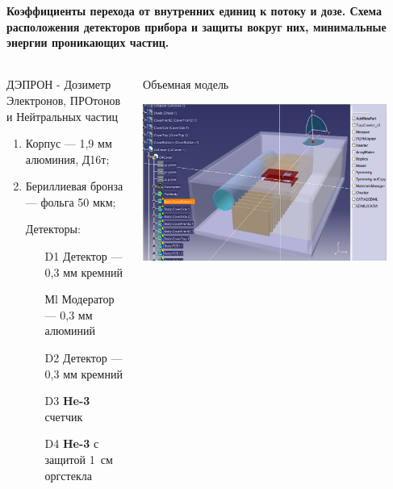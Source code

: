\documentclass[t, aspectratio=43]{beamer}
\begin{document}
\begin{frame}
\frametitle{\insertsection} 
\framesubtitle{Коэффициенты перехода от внутренних единиц к потоку и
дозе. Схема расположения детекторов прибора и защиты вокруг них, минимальные энергии проникающих частиц.}
\begin{columns}[T]
	\begin{column}{.5\textwidth}
		\begin{block}{	 }		
		\tiny ДЭПРОН - Дозиметр Электронов, ПРОтонов и Нейтральных частиц 	
	 		\begin{enumerate}		
				\item Корпус --- 1,9 мм алюминия, Д16т;
				\item  Бериллиевая бронза --- фольга 50 мкм;
				\item[] Детекторы:				
				\begin{enumerate}
					\tiny
					\item[D1] Детектор 	--- 0,3 мм кремний
					\item[Мl] Модератор  	--- 0,3 мм алюминий
					\item[D2] Детектор 	--- 0,3 мм кремний
					\item[D3] \textbf{He-3} счетчик	
					\item[D4] \textbf{He-3} с защитой 1~см оргстекла
				\end{enumerate}
			\end{enumerate}
		\end{block}
	\end{column}
	\begin{column}{.5\textwidth}
		\begin{block}{}
			\tiny Объемная модель
			
			\includegraphics[width=0.9\textwidth]{images/deproncatia2}
		

\end{block}
\end{column}
\end{columns}
\end{frame}
\end{document}
